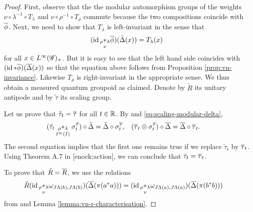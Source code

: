 \begin{proof}
  First, observe that the  the modular
  automorphism groups of the weights $\nu \circ \lambda^{-1} \circ
  T_{\lambda}$ and $\nu \circ \rho^{-1} \circ T_{\rho}$ commute  because the two
  compositions coincide with $\overline{\phi}$. Next, we need  to show that
  $T_{\lambda}$ is left-invariant in the sense that
  \begin{align*}
   (\operatorname{id} \underset{\nu}{_{\rho}\ast_{\lambda}} \overline{\phi})(\tilde\Delta(x)) = T_{\lambda}(x) 
  \end{align*}
  for all $x\in L^{\infty}(\mathscr{G})_{+}$. But it is easy to see that the left hand
  side coincides with $(\operatorname{id} \ast \overline{\phi})(\overline{\Delta}(x))$ so that the
  equation above follows from Proposition
  \ref{prop:vn-invariance}. Likewise $T_{\rho}$ is right-invariant in
  the appropriate sense. We thus obtain a measured quantum groupoid as
  claimed.  Denote by $\tilde R$ its unitary antipode and by
  $\tilde\tau$ its scaling group.

  Let us prove that $\tilde \tau_{t}=\overline{\tau}$ for all $t\in \mathbb{R}$. By
  \cite{} and \eqref{eq:scaling-modular-delta},
  \begin{align*}
    (\tilde \tau_{t} \underset{l^{\infty}(I)}{_{\rho}\ast_{\lambda}} \sigma^{\overline{\tau}}_{t}) \circ \tilde \Delta
    &=\tilde \Delta \circ \sigma^{\overline{\tau}}_{t}, & (\overline{\tau}_{t} \otimes
    \sigma^{\overline{\tau}}_{t}) \circ \overline{\Delta} &= \overline{\Delta} \circ \overline{\tau}_{t}.
  \end{align*}
  The second equation implies that the first one remains true if we
  replace $\tilde\tau_{t}$ by $\overline{\tau}_{t}$.  Using Theorem A.7 in
  \cite{} [enock:action], we can conclude that $\tilde
  \tau_{t}=\overline{\tau}_{t}$.

 To prove that $\tilde R=\overline{R}$, we use the relations
  \begin{align*}
    \tilde R(\operatorname{id} \underset{\nu}{_{\rho} \ast_{\lambda}}
    \omega_{J\Lambda(b),J\Lambda(b)})(\overline{\Delta}(\pi(a^{*}a))) &= (\operatorname{id}
    \underset{\nu}{_{\rho} \ast_{\lambda}}
    \omega_{J\Lambda(a),J\Lambda(a)})(\overline{\Delta}(\pi(b^{*}b)))
  \end{align*}
from \cite{} and Lemma \ref{lemma:vn-r-characterisation}.
\end{proof}


